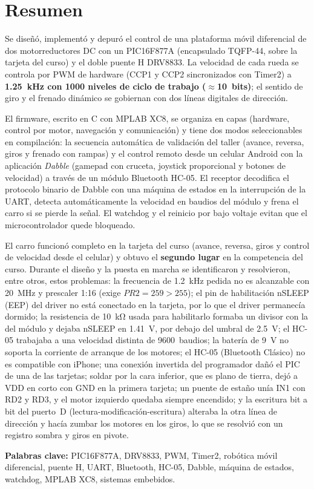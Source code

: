 \section*{Resumen}

Se diseñó, implementó y depuró el control de una plataforma móvil diferencial
de dos motorreductores DC con un PIC16F877A (encapsulado TQFP-44, sobre la
tarjeta del curso) y el doble puente H DRV8833. La velocidad de cada rueda se
controla por PWM de hardware (CCP1 y CCP2 sincronizados con Timer2) a
\textbf{\SI{1.25}{\kilo\hertz} con 1000 niveles de ciclo de trabajo
($\approx$10~bits)}; el sentido de giro y el frenado dinámico se gobiernan con
dos líneas digitales de dirección.

El firmware, escrito en C con MPLAB XC8, se organiza en capas (hardware,
control por motor, navegación y comunicación) y tiene dos modos seleccionables
en compilación: la secuencia automática de validación del taller (avance,
reversa, giros y frenado con rampas) y el control remoto desde un celular
Android con la aplicación \emph{Dabble} (gamepad con cruceta, joystick
proporcional y botones de velocidad) a través de un módulo Bluetooth HC-05. El
receptor decodifica el protocolo binario de Dabble con una máquina de estados en
la interrupción de la UART, detecta automáticamente la velocidad en baudios del
módulo y frena el carro si se pierde la señal. El watchdog y el reinicio por
bajo voltaje evitan que el microcontrolador quede bloqueado.

El carro funcionó completo en la tarjeta del curso (avance, reversa, giros y
control de velocidad desde el celular) y obtuvo el \textbf{segundo lugar} en la
competencia del curso. Durante el diseño y la puesta en marcha se
identificaron y resolvieron, entre otros, estos problemas: la frecuencia de \SI{1.2}{\kilo\hertz} pedida no es alcanzable con
\SI{20}{\mega\hertz} y prescaler 1:16 (exige $PR2 = 259 > 255$); el pin de
habilitación nSLEEP (EEP) del driver no está conectado en la tarjeta, por lo que
el driver permanecía dormido; la resistencia de \SI{10}{\kilo\ohm} usada para
habilitarlo formaba un divisor con la del módulo y dejaba nSLEEP en
\SI{1.41}{\volt}, por debajo del umbral de \SI{2.5}{\volt}; el HC-05 trabajaba
a una velocidad distinta de 9600~baudios; la batería de \SI{9}{\volt} no
soporta la corriente de arranque de los motores; el HC-05 (Bluetooth Clásico)
no es compatible con iPhone; una conexión invertida del programador dañó el
PIC de una de las tarjetas; soldar por la cara inferior, que es plano de
tierra, dejó a VDD en corto con GND en la primera tarjeta; un puente de estaño
unía IN1 con RD2 y RD3, y el motor izquierdo quedaba siempre encendido; y la
escritura bit a bit del puerto~D (lectura-modificación-escritura) alteraba la
otra línea de dirección y hacía zumbar los motores en los giros, lo que se
resolvió con un registro sombra y giros en pivote.

\medskip
\noindent\textbf{Palabras clave:} PIC16F877A, DRV8833, PWM, Timer2, robótica
móvil diferencial, puente H, UART, Bluetooth, HC-05, Dabble, máquina de
estados, watchdog, MPLAB XC8, sistemas embebidos.
